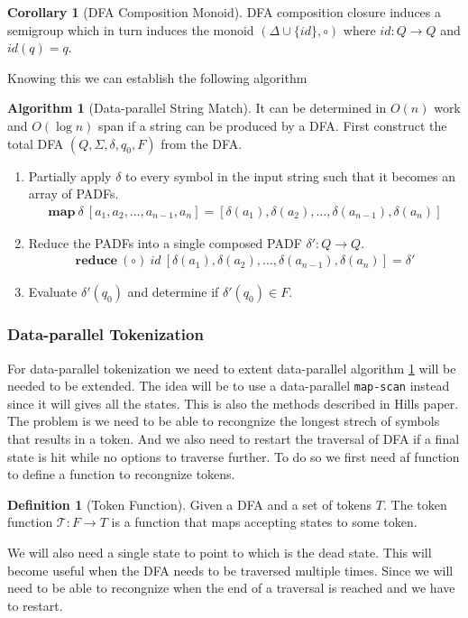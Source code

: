 \documentclass[a4paper,12pt]{article}
\theoremstyle{definition}
\newtheorem{definition}{Definition}[section]
\newtheorem{corollary}{Corollary}[section]
\newtheorem{algorithm}{Algorithm}[section]
\begin{document}
\begin{corollary}[DFA Composition Monoid]
  DFA composition closure induces a semigroup which in turn induces the monoid $(\Delta \cup \{id\}, \circ)$ where $id: Q \to Q$ and $id(q) = q$.
\end{corollary}
\noindent Knowing this we can establish the following algorithm
\begin{algorithm}[Data-parallel String Match]\label{algo:lex}
  It can be determined in $O(n)$ work and $O(\log n)$ span if a string can be produced by a DFA. First construct the total DFA $(Q, \Sigma, \delta, q_0, F)$ from the DFA.
  \begin{enumerate}
    \item Partially apply $\delta$ to every symbol in the input string such that it becomes an array of PADFs.
    \begin{align*}
      \mathbf{map}\: \delta \: [a_1, a_2, \dots, a_{n - 1}, a_n] = [\delta(a_1), \delta(a_2), \dots, \delta(a_{n - 1}), \delta(a_n)]
    \end{align*}
    \item Reduce the PADFs into a single composed PADF $\delta': Q \to Q$. \begin{align*}
      \mathbf{reduce} \: (\circ) \: id \: [\delta(a_1), \delta(a_2), \dots, \delta(a_{n - 1}), \delta(a_n)] = \delta'
    \end{align*}
    \item Evaluate $\delta'(q_0)$ and determine if $\delta'(q_0) \in F$.
  \end{enumerate}
\end{algorithm}

\subsubsection{Data-parallel Tokenization}
For data-parallel tokenization we need to extent data-parallel algorithm \ref{algo:lex} will be needed to be extended. The idea will be to use a data-parallel \texttt{map-scan} instead since it will gives all the states. This is also the methods described in Hills \cite{HILL1992699} paper. The problem is we need to be able to recongnize the longest strech of symbols that results in a token. And we also need to restart the traversal of DFA if a final state is hit while no options to traverse further. To do so we first need af function to define a function to recongnize tokens.

\begin{definition}[Token Function]
  Given a DFA and a set of tokens $T$. The token function $\mathcal{T}: F \to T$ is a function that maps accepting states to some token.
\end{definition}
\noindent We will also need a single state to point to which is the dead state. This will become useful when the DFA needs to be traversed multiple times. Since we will need to be able to recongnize when the end of a traversal is reached and we have to restart.
\end{document}

